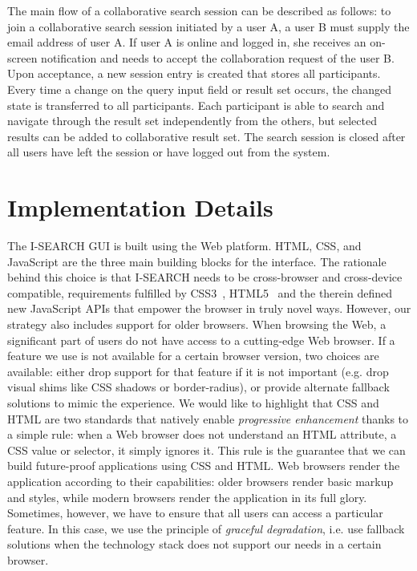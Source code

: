 \documentclass[runningheads,a4paper]{llncs} \usepackage[utf8]{inputenc}
\begin{document}
The main flow of a collaborative search session can be described as follows: to join a collaborative search session initiated by a user A, a user B must supply the email address of user A. If user A is online and logged in, she receives an on-screen notification and needs to accept the collaboration request of the user B. Upon acceptance, a new session entry is created that stores all participants. Every time a change on the query input field or result set occurs, the changed state is transferred to all participants. Each participant is able to search and navigate through the result set independently from the others, but selected results can be added to collaborative result set. The search session is closed after all users have left the session or have logged out from the system.

\section{Implementation Details}
The \mbox{I-SEARCH} GUI is built using the Web platform. HTML, CSS, and Java\-Script are the three main building blocks for the interface. The rationale behind this choice is that \mbox{I-SEARCH} needs to be cross-browser and cross-device compatible, requirements fulfilled by CSS3~\cite{css3}, HTML5~\cite{html5} and the therein defined new JavaScript APIs that empower the browser in truly novel ways. However, our strategy also includes support for older browsers. When browsing the Web, a significant part of users do not have access to a cutting-edge Web browser. If a feature we use is not available for a certain browser version, two choices are available: either drop support for that feature if it is not important (e.g. drop visual shims like CSS shadows or border-radius), or provide alternate fallback solutions to mimic the experience. We would like to highlight that CSS and HTML are two standards that natively enable \emph{progressive enhancement} thanks to a simple rule: when a Web browser does not understand an HTML attribute, a CSS value or selector, it simply ignores it. This rule is the guarantee that we can build future-proof applications using CSS and HTML. Web browsers render the application according to their capabilities: older browsers render basic markup and styles, while modern browsers render the application in its full glory. Sometimes, however, we have to ensure that all users can access a particular feature. In this case, we use the principle of \emph{graceful degradation}, i.e. use fallback solutions when the technology stack does not support our needs in a certain browser.
\end{document}
